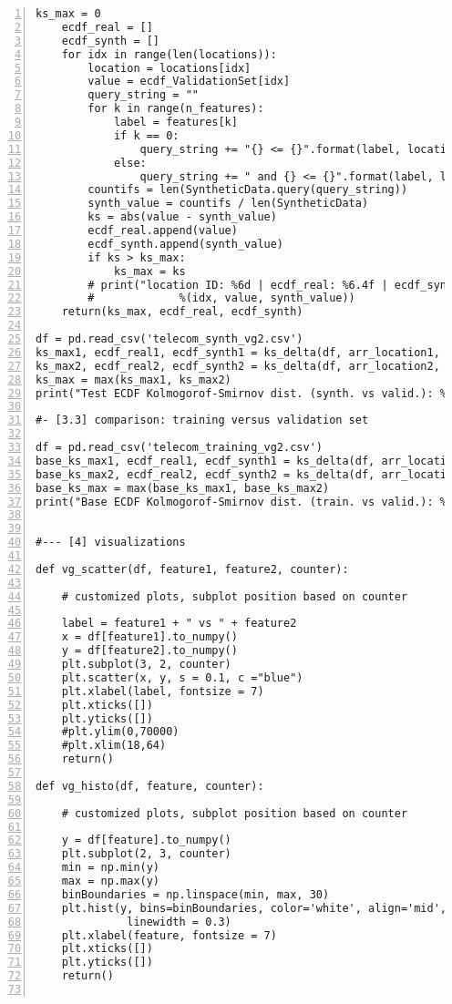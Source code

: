 \documentclass[oneside,10pt]{book}
\begin{document}
\begin{lstlisting}[numbers=left]
    ks_max = 0
    ecdf_real = []
    ecdf_synth = []
    for idx in range(len(locations)):
        location = locations[idx]
        value = ecdf_ValidationSet[idx]
        query_string = ""
        for k in range(n_features):
            label = features[k]
            if k == 0:
                query_string += "{} <= {}".format(label, location[k])
            else: 
                query_string += " and {} <= {}".format(label, location[k])
        countifs = len(SyntheticData.query(query_string))
        synth_value = countifs / len(SyntheticData)
        ks = abs(value - synth_value)
        ecdf_real.append(value)
        ecdf_synth.append(synth_value)
        if ks > ks_max:
            ks_max = ks
        # print("location ID: %6d | ecdf_real: %6.4f | ecdf_synth: %6.4f"
        #             %(idx, value, synth_value))
    return(ks_max, ecdf_real, ecdf_synth)

df = pd.read_csv('telecom_synth_vg2.csv')
ks_max1, ecdf_real1, ecdf_synth1 = ks_delta(df, arr_location1, arr_value1)
ks_max2, ecdf_real2, ecdf_synth2 = ks_delta(df, arr_location2, arr_value2)
ks_max = max(ks_max1, ks_max2)
print("Test ECDF Kolmogorof-Smirnov dist. (synth. vs valid.): %6.4f" %(ks_max))

#- [3.3] comparison: training versus validation set

df = pd.read_csv('telecom_training_vg2.csv')
base_ks_max1, ecdf_real1, ecdf_synth1 = ks_delta(df, arr_location1, arr_value1)
base_ks_max2, ecdf_real2, ecdf_synth2 = ks_delta(df, arr_location2, arr_value2)
base_ks_max = max(base_ks_max1, base_ks_max2)
print("Base ECDF Kolmogorof-Smirnov dist. (train. vs valid.): %6.4f" %(base_ks_max))


#--- [4] visualizations

def vg_scatter(df, feature1, feature2, counter):

    # customized plots, subplot position based on counter

    label = feature1 + " vs " + feature2
    x = df[feature1].to_numpy()
    y = df[feature2].to_numpy()
    plt.subplot(3, 2, counter)
    plt.scatter(x, y, s = 0.1, c ="blue")
    plt.xlabel(label, fontsize = 7)
    plt.xticks([])
    plt.yticks([])
    #plt.ylim(0,70000)
    #plt.xlim(18,64)
    return()

def vg_histo(df, feature, counter):

    # customized plots, subplot position based on counter

    y = df[feature].to_numpy()
    plt.subplot(2, 3, counter)
    min = np.min(y)
    max = np.max(y)
    binBoundaries = np.linspace(min, max, 30)
    plt.hist(y, bins=binBoundaries, color='white', align='mid',edgecolor='red',
              linewidth = 0.3) 
    plt.xlabel(feature, fontsize = 7)
    plt.xticks([])
    plt.yticks([])
    return()


\end{lstlisting}
\end{document}
